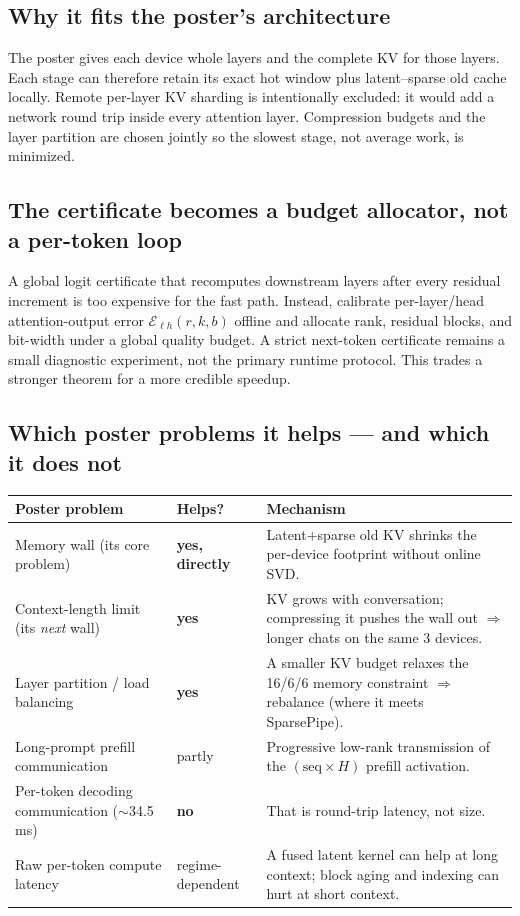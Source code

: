 \documentclass[11pt]{article}
\begin{document}
\subsection{Why it fits the poster's architecture}
The poster gives each device whole layers and the complete KV for those layers. Each stage can
therefore retain its exact hot window plus latent--sparse old cache locally. Remote per-layer KV
sharding is intentionally excluded: it would add a network round trip inside every attention
layer. Compression budgets and the layer partition are chosen jointly so the slowest stage,
not average work, is minimized.

\subsection{The certificate becomes a budget allocator, not a per-token loop}
A global logit certificate that recomputes downstream layers after every residual increment is
too expensive for the fast path. Instead, calibrate per-layer/head attention-output error
$\mathcal E_{\ell h}(r,k,b)$ offline and allocate rank, residual blocks, and bit-width under a
global quality budget. A strict next-token certificate remains a small diagnostic experiment,
not the primary runtime protocol. This trades a stronger theorem for a more credible speedup.

\subsection{Which poster problems it helps --- and which it does not}
\begin{center}
\renewcommand{\arraystretch}{1.3}
\small
\begin{tabular}{@{}p{4.5cm}p{1.7cm}p{6.3cm}@{}}
\toprule
\textbf{Poster problem} & \textbf{Helps?} & \textbf{Mechanism} \\
\midrule
Memory wall (its core problem) & \textbf{yes, directly} & Latent$+$sparse old KV shrinks the per-device footprint without online SVD. \\
Context-length limit (its \emph{next} wall) & \textbf{yes} & KV grows with conversation; compressing it pushes the wall out $\Rightarrow$ longer chats on the same 3 devices. \\
Layer partition / load balancing & \textbf{yes} & A smaller KV budget relaxes the 16/6/6 memory constraint $\Rightarrow$ rebalance (where it meets SparsePipe). \\
Long-prompt prefill communication & partly & Progressive low-rank transmission of the $(\text{seq}\times H)$ prefill activation. \\
Per-token decoding communication ($\sim$34.5\,ms) & \textbf{no} & That is round-trip latency, not size. \\
Raw per-token compute latency & regime-dependent & A fused latent kernel can help at long context; block aging and indexing can hurt at short context. \\
\bottomrule
\end{tabular}
\end{center}
\end{document}

